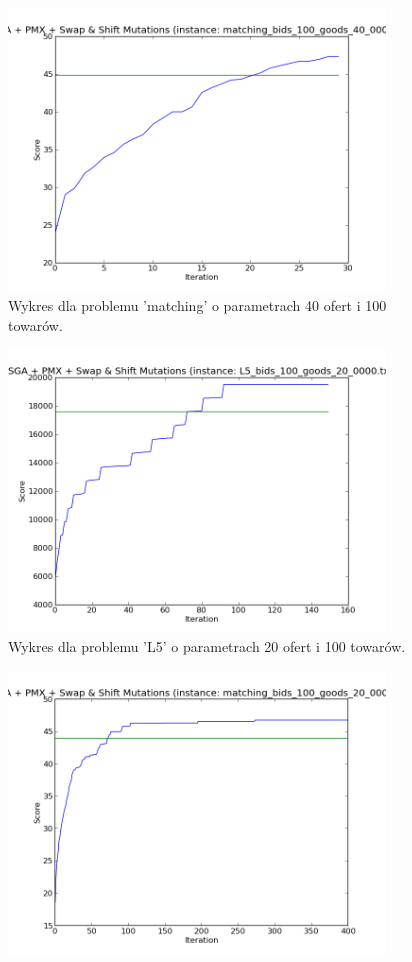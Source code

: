 \begin{figure}[ht!]
    \centering
    \includegraphics[width=10cm]{wykresy/matching_bids_100_goods_40_0000_txt_3.png}
    \caption{Wykres dla problemu 'matching' o parametrach 40 ofert i 100 towarów.}
\end{figure}

\begin{figure}[ht!]
    \centering
    \includegraphics[width=10cm]{wykresy/L5_bids_100_goods_20_0000_txt_1.png}
    \caption{Wykres dla problemu 'L5' o parametrach 20 ofert i 100 towarów.}
\end{figure}

\begin{figure}[ht!]
    \centering
    \includegraphics[width=10cm]{wykresy/matching_bids_100_goods_20_0000_txt_uniq.png}
\end{figure}


